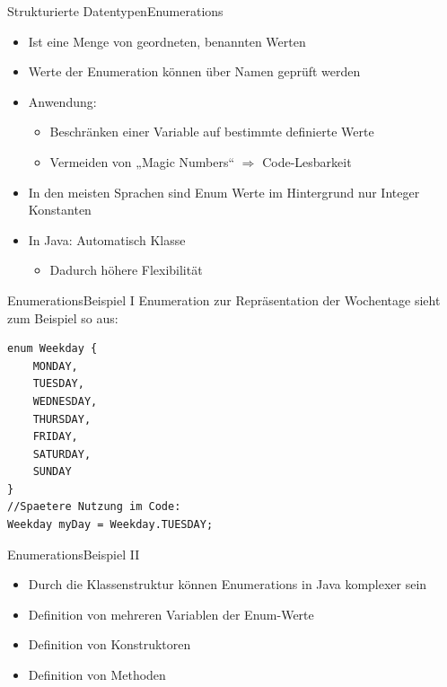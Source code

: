 \begin{frame}{Strukturierte Datentypen}{Enumerations}
    \begin{itemize}
        \item Ist eine Menge von geordneten, benannten Werten
        \item Werte der Enumeration können über Namen geprüft werden
        \item Anwendung:
        \begin{itemize}
            \item Beschränken einer Variable auf bestimmte definierte Werte
            \item Vermeiden von „Magic Numbers“ $\Rightarrow$ Code-Lesbarkeit
        \end{itemize}
        \item In den meisten Sprachen sind Enum Werte im Hintergrund nur Integer Konstanten
        \item In Java: Automatisch Klasse
        \begin{itemize}
            \item Dadurch höhere Flexibilität
        \end{itemize}
    \end{itemize}
\end{frame}

\begin{frame}[fragile]{Enumerations}{Beispiel I}
Enumeration zur Repräsentation der Wochentage sieht zum Beispiel so aus:
\lstset{style=java}
\begin{lstlisting}
enum Weekday {
    MONDAY,
    TUESDAY,
    WEDNESDAY,
    THURSDAY,
    FRIDAY,
    SATURDAY,
    SUNDAY
}
//Spaetere Nutzung im Code:
Weekday myDay = Weekday.TUESDAY;
\end{lstlisting}
\end{frame}

\begin{frame}{Enumerations}{Beispiel II}
	\begin{itemize}
		\item Durch die Klassenstruktur können Enumerations in Java komplexer sein
		\item Definition von mehreren Variablen der Enum-Werte
		\item Definition von Konstruktoren
		\item Definition von Methoden
	\end{itemize}
\end{frame}

